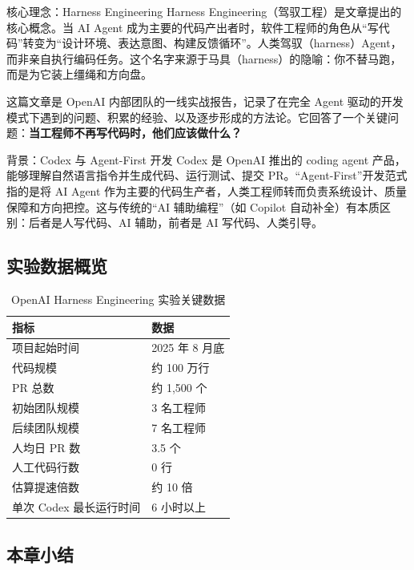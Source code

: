 \documentclass[a4paper]{article}
\begin{document}
\begin{importantbox}{核心理念：Harness Engineering}
Harness Engineering（驾驭工程）是文章提出的核心概念。当 AI Agent 成为主要的代码产出者时，软件工程师的角色从``写代码''转变为``设计环境、表达意图、构建反馈循环''。人类驾驭（harness）Agent，而非亲自执行编码任务。这个名字来源于马具（harness）的隐喻：你不替马跑，而是为它装上缰绳和方向盘。
\end{importantbox}

这篇文章是 OpenAI 内部团队的一线实战报告，记录了在完全 Agent 驱动的开发模式下遇到的问题、积累的经验、以及逐步形成的方法论。它回答了一个关键问题：\textbf{当工程师不再写代码时，他们应该做什么？}

\begin{knowledgebox}{背景：Codex 与 Agent-First 开发}
Codex 是 OpenAI 推出的 coding agent 产品，能够理解自然语言指令并生成代码、运行测试、提交 PR。``Agent-First''开发范式指的是将 AI Agent 作为主要的代码生产者，人类工程师转而负责系统设计、质量保障和方向把控。这与传统的``AI 辅助编程''（如 Copilot 自动补全）有本质区别：后者是人写代码、AI 辅助，前者是 AI 写代码、人类引导。
\end{knowledgebox}

\subsection{实验数据概览}

\begin{table}[H]
\centering
\begin{tabular}{ll}
\toprule
\textbf{指标} & \textbf{数据} \\
\midrule
项目起始时间 & 2025 年 8 月底 \\
代码规模 & 约 100 万行 \\
PR 总数 & 约 1,500 个 \\
初始团队规模 & 3 名工程师 \\
后续团队规模 & 7 名工程师 \\
人均日 PR 数 & 3.5 个 \\
人工代码行数 & 0 行 \\
估算提速倍数 & 约 10 倍 \\
单次 Codex 最长运行时间 & 6 小时以上 \\
\bottomrule
\end{tabular}
\caption{OpenAI Harness Engineering 实验关键数据}
\end{table}

\subsection{本章小结}
\end{document}
